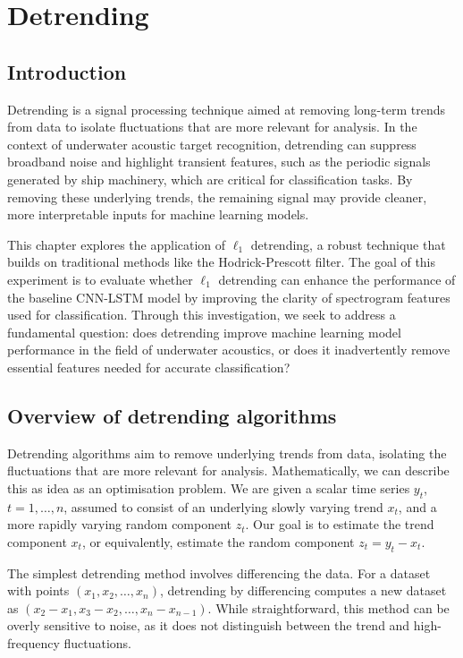 \chapter{Detrending}\label{chap:detrending}

\section{Introduction}

Detrending is a signal processing technique aimed at removing long-term trends from data to isolate fluctuations that are more relevant for analysis. In the context of underwater acoustic target recognition, detrending can suppress broadband noise and highlight transient features, such as the periodic signals generated by ship machinery, which are critical for classification tasks. By removing these underlying trends, the remaining signal may provide cleaner, more interpretable inputs for machine learning models.

This chapter explores the application of $\ell_1$ detrending, a robust technique that builds on traditional methods like the Hodrick-Prescott filter. The goal of this experiment is to evaluate whether $\ell_1$ detrending can enhance the performance of the baseline CNN-LSTM model by improving the clarity of spectrogram features used for classification. Through this investigation, we seek to address a fundamental question: does detrending improve machine learning model performance in the field of underwater acoustics, or does it inadvertently remove essential features needed for accurate classification? 

\section{Overview of detrending algorithms}

Detrending algorithms aim to remove underlying trends from data, isolating the fluctuations that are more relevant for analysis. Mathematically, we can describe this as idea as an optimisation problem. We are given a scalar time series $y_t$, $t = 1, \ldots, n$, assumed to consist of an underlying slowly varying trend $x_t$, and a more rapidly varying random component $z_t$. Our goal is to estimate the trend component $x_t$, or equivalently, estimate the random component $z_t = y_t - x_t$. 

The simplest detrending method involves differencing the data. For a dataset with points $(x_1, x_2, \ldots, x_n)$, detrending by differencing computes a new dataset as $(x_2 - x_1, x_3 - x_2, \ldots, x_n - x_{n-1})$. While straightforward, this method can be overly sensitive to noise, as it does not distinguish between the trend and high-frequency fluctuations.

